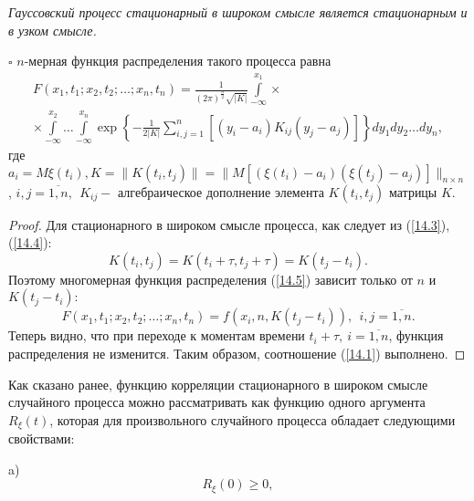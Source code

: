     \begin{theorem}\label{smd_theor_1} \textit{Гауссовский процесс стационарный в широком смысле является стационарным и в узком смысле.}
    
    $\square$ $n$-мерная функция распределения такого процесса равна
    \begin{equation}
        \begin{gathered}
        F\left(x_1, t_1 ; x_2, t_2 ; \ldots ; x_n, t_n\right)=\frac{1}{(2 \pi)^{\frac{n}{2}} \sqrt{|K|}} \int\limits_{-\infty}^{x_1} \times \\
        \times \int\limits_{-\infty}^{x_2} \ldots \int\limits_{-\infty}^{x_n} 
        \exp \left\{-\frac{1}{2|K|} \sum_{i, j=1}^n\left[\left(y_i-a_i\right) K_{i j}\left(y_j-a_j\right)\right]\right\}  d y_1 d y_2 \dots d y_n , 
        \end{gathered}
        \label{14.5}
    \end{equation}
    где $a_i=M \xi\left(t_i\right), K=\parallel  K\left(t_i, t_j\right)\parallel  =\parallel  M\left[\left(\xi\left(t_i\right)-a_i\right)\left(\xi\left(t_j\right)-a_j\right)\right]\parallel  _{n \times n}$, \newline $i, j=\overline{1, n}, \ \  K_{i j} -$  алгебраическое дополнение элемента $K\left(t_i, t_j\right)$ матрицы $K$. 
    \end{theorem}

	\begin{proof}
    Для стационарного в широком смысле процесса, как следует из (\ref{14.3}), (\ref{14.4}):
    $$
    K\left(t_i, t_j\right)=K\left(t_i+\tau, t_j+\tau\right)=K\left(t_j-t_i\right) .
    $$
    Поэтому многомерная функция распределения (\ref{14.5}) зависит только от $n$ и $K\left(t_j-t_i\right):$
    $$
    F\left(x_1, t_1 ; x_2, t_2 ; \ldots ; x_n, t_n\right)=f\left(x_i, n, K\left(t_j-t_i\right)\right),\ \  i, j=\overline{1, n} .
    $$
    Теперь видно, что при переходе к моментам времени $t_i+\tau, \  i=\overline{1, n}$, функция распределения не изменится. 
    Таким образом, соотношение (\ref{14.1}) выполнено.
    \end{proof}

    Как сказано ранее, функцию корреляции стационарного в широком смысле случайного процесса можно рассматривать как функцию одного аргумента $R_{\xi}(t)$, которая для произвольного случайного процесса обладает следующими свойствами:
    
    a)  \begin{equation}
            R_{\xi}(0) \geq 0 ,
            \label{14.6}
        \end{equation}
        
